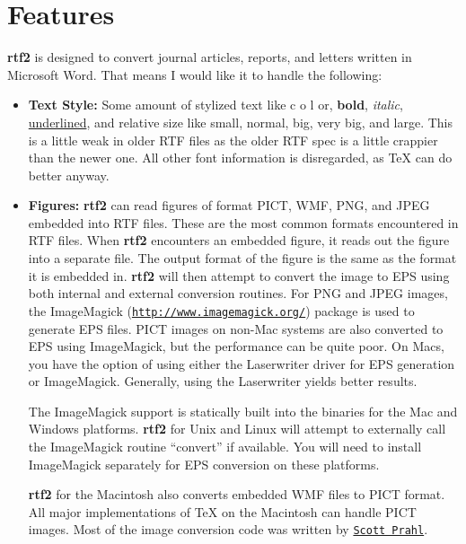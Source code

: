 \documentclass[11pt]{article}
\def\rtf2latex2e{{\bf rtf2\LaTeXe}}
\def\urlone#1{\mbox{\href{#1}{\tt #1}}}
\def\urltwo#1#2{\mbox{\href{#1}{\tt #2}}}
\begin{document}
\section{Features} 
\rtf2latex2e is designed to convert journal articles, reports, and
letters written in Microsoft Word.  That means I would like it to
handle the following:

\begin{itemize}

\item 
\textbf{Text Style:} Some amount of stylized text like
{\color{color6} c}{\color{color2} o}{\color{color4} l}{\color{color10}
o}r, {\bf bold}, {\em italic}, {\underline {underlined}}, and relative
size like {\small small}, normal, {\LARGE big}, {\huge very big},
{\Huge and large}.  This is a little weak in older RTF files as the
older RTF spec is a little crappier than the newer one.  All other
font information is disregarded, as TeX can do better anyway.

\item 
\textbf{Figures:} \rtf2latex2e can read figures
of format PICT, WMF, PNG, and JPEG embedded into RTF files.  These are
the most common formats encountered in RTF files.  When \rtf2latex2e
encounters an embedded figure, it reads out the figure into a separate
file.  The output format of the figure is the same as the format it is
embedded in. \rtf2latex2e will then attempt to convert the image to EPS
using both internal and external conversion routines. For PNG and JPEG
images, the ImageMagick (\urlone{http://www.imagemagick.org/})
package is used to generate EPS files. PICT images on non-Mac systems
are also converted to EPS using ImageMagick, but the performance can be
quite poor. On Macs, you have the option of using either the Laserwriter
driver for EPS generation or ImageMagick. Generally, using the Laserwriter
yields better results.

The ImageMagick support is statically built into the binaries for the
Mac and Windows platforms. \rtf2latex2e for Unix and Linux will attempt
to externally call the ImageMagick routine ``convert'' if available.
You will need to install ImageMagick separately for EPS conversion on
these platforms.

\rtf2latex2e for the Macintosh also converts embedded
WMF files to PICT format.  All major implementations of {\TeX} on the
Macintosh can handle PICT images.   Most of the image
conversion code was written by \urltwo{mailto:prahl@ece.ogi.edu}{Scott
Prahl}.



\end{itemize}
\end{document}
